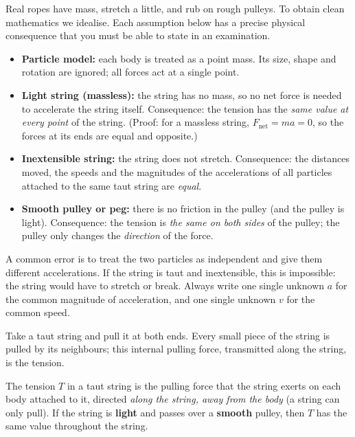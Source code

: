 \documentclass[11pt]{article}
\newcommand{\cle}[1]{{\popxbold\color{popdark}#1}}
\newcounter{popsec}
\newcounter{popsub}
\newcommand{\courssub}[1]{%
  \stepcounter{popsub}%
  \par\vspace{9pt}\noindent{\popxbold\fontsize{11.5}{13}\selectfont\color{popink}{\color{poporange}\thepopsec.\thepopsub}\hspace{6pt}#1}\par\nopagebreak\vspace{4pt}
}
\begin{document}
Real ropes have mass, stretch a little, and rub on rough pulleys. To obtain clean mathematics we idealise. Each assumption below has a precise physical consequence that you must be able to state in an examination.

\begin{aretenir}
\begin{itemize}
\item \textbf{Particle model:} each body is treated as a point mass. Its size, shape and rotation are ignored; all forces act at a single point.
\item \textbf{Light string (massless):} the string has no mass, so no net force is needed to accelerate the string itself. Consequence: the \cle{tension} has the \emph{same value at every point} of the string. (Proof: for a massless string, $F_{\text{net}} = m a = 0$, so the forces at its ends are equal and opposite.)
\item \textbf{Inextensible string:} the string does not stretch. Consequence: the distances moved, the speeds and the magnitudes of the accelerations of all particles attached to the same taut string are \emph{equal}.
\item \textbf{Smooth pulley or peg:} there is no friction in the pulley (and the pulley is light). Consequence: the tension is \emph{the same on both sides} of the pulley; the pulley only changes the \emph{direction} of the force.
\end{itemize}
\end{aretenir}

\begin{attention}
A common error is to treat the two particles as independent and give them different accelerations. If the string is taut and inextensible, this is impossible: the string would have to stretch or break. Always write one single unknown $a$ for the common magnitude of acceleration, and one single unknown $v$ for the common speed.
\end{attention}

\courssub{Tension in Strings}

Take a taut string and pull it at both ends. Every small piece of the string is pulled by its neighbours; this internal pulling force, transmitted along the string, is the \cle{tension}.

\begin{definition}[Tension]
The \cle{tension} $T$ in a taut string is the pulling force that the string exerts on each body attached to it, directed \emph{along the string, away from the body} (a string can only pull). If the string is \textbf{light} and passes over a \textbf{smooth} pulley, then $T$ has the same value throughout the string.
\end{definition}
\end{document}
